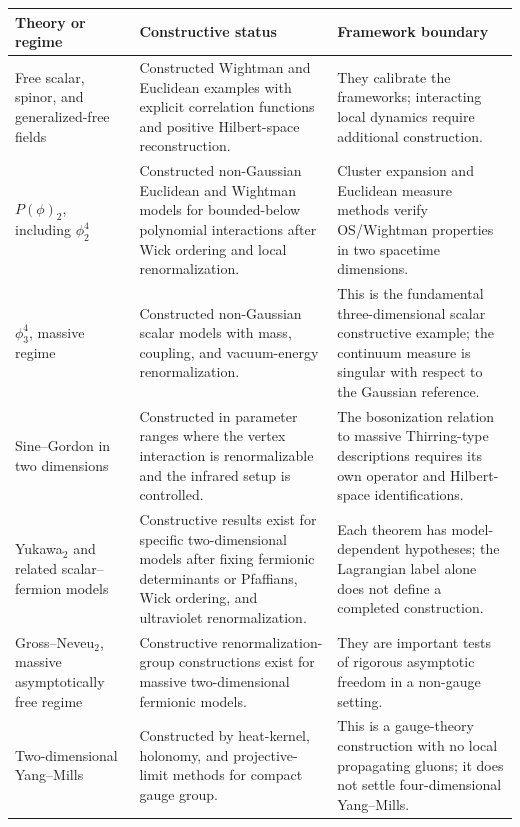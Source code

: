 \begin{table}[H]
\centering
\scriptsize
\renewcommand{\arraystretch}{0.98}
\begin{tabular}{@{}>{\raggedright\arraybackslash}p{}
  >{\raggedright\arraybackslash}p{}
  >{\raggedright\arraybackslash}p{}@{}}
\hline
Theory or regime & Constructive status & Framework boundary \\
\hline
Free scalar, spinor, and generalized-free fields &
Constructed Wightman and Euclidean examples with explicit correlation
functions and positive Hilbert-space reconstruction. &
They calibrate the frameworks; interacting local dynamics require additional
construction. \\
\(P(\phi)_2\), including \(\phi^4_2\) &
Constructed non-Gaussian Euclidean and Wightman models for bounded-below
polynomial interactions after Wick ordering and local renormalization. &
Cluster expansion and Euclidean measure methods verify OS/Wightman
properties in two spacetime dimensions. \\
\(\phi^4_3\), massive regime &
Constructed non-Gaussian scalar models with mass, coupling, and vacuum-energy
renormalization. &
This is the fundamental three-dimensional scalar constructive example; the
continuum measure is singular with respect to the Gaussian reference. \\
Sine--Gordon in two dimensions &
Constructed in parameter ranges where the vertex interaction is
renormalizable and the infrared setup is controlled. &
The bosonization relation to massive Thirring-type descriptions requires its
own operator and Hilbert-space identifications. \\
Yukawa\(_2\) and related scalar--fermion models &
Constructive results exist for specific two-dimensional models after fixing
fermionic determinants or Pfaffians, Wick ordering, and ultraviolet
renormalization. &
Each theorem has model-dependent hypotheses; the Lagrangian label alone does
not define a completed construction. \\
Gross--Neveu\(_2\), massive asymptotically free regime &
Constructive renormalization-group constructions exist for massive
two-dimensional fermionic models. &
They are important tests of rigorous asymptotic freedom in a non-gauge
setting. \\
Two-dimensional Yang--Mills &
Constructed by heat-kernel, holonomy, and projective-limit methods for compact
gauge group. &
This is a gauge-theory construction with no local propagating gluons; it does
not settle four-dimensional Yang--Mills. \\

\end{tabular}
\end{table}
